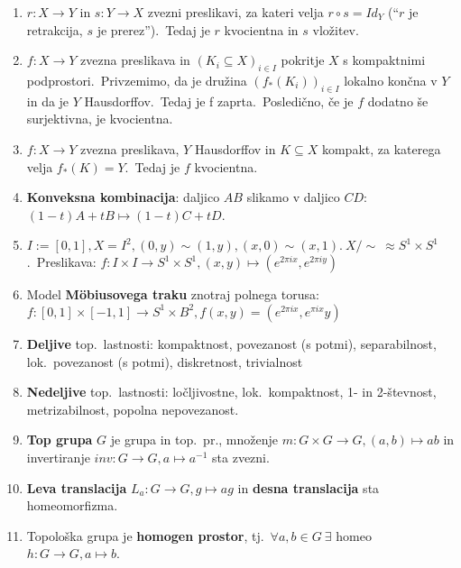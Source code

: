 \documentclass[10pt,a4paper]{article}
\begin{document}
\begin{enumerate}
\item  $r: X \rightarrow Y$ in $s: Y \rightarrow X$ zvezni preslikavi, za
    kateri velja $r \circ  s = Id_Y$ (``$r$ je retrakcija, $s$ je prerez'').~Tedaj je $r$
    kvocientna in $s$ vložitev.
    
\item  $f : X \rightarrow Y$ zvezna preslikava in $(K_i \subseteq  X)_{i \in I}$ pokritje
    $X$ s kompaktnimi podprostori.~Privzemimo, da je družina $(f_*(K_i))_{i \in I}$
    lokalno končna v $Y$ in da je $Y$ Hausdorffov.~Tedaj je f zaprta.~Posledično,
    če je $f$ dodatno še surjektivna, je kvocientna.
    
\item  $f : X \rightarrow Y$ zvezna preslikava, $Y$ Hausdorffov in $K \subseteq X$
    kompakt, za katerega velja $f_*(K) = Y$.~Tedaj je $f$ kvocientna.
    
\item \textbf{Konveksna kombinacija}: daljico $AB$ slikamo v daljico $CD: $
    $(1-t)A + tB \mapsto (1-t)C + tD$.
    
\item $I := [0, 1], X = I^2, (0, y) \sim (1, y), (x, 0) \sim (x, 1).~X/\sim \
    \approx S^1 \times S^1$.~Preslikava: $f: I \times I \rightarrow S^1 \times S^1,
    (x, y) \mapsto (e^{2 \pi i x}, e^{2 \pi i y})$
    
\item Model \textbf{Möbiusovega traku} znotraj polnega torusa: $f: [0, 1] \times [-1, 1]
    \rightarrow S^1 \times B^2, f(x, y) = (e^{2 \pi i x}, e^{\pi i x}y)$
    
\item \textbf{Deljive} top.~lastnosti: kompaktnost, povezanost (s potmi), separabilnost,
    lok.~povezanost (s potmi), diskretnost, trivialnost
    
\item \textbf{Nedeljive} top.~lastnosti: ločljivostne, lok.~kompaktnost, 1- in 2-števnost,
    metrizabilnost, popolna nepovezanost.
    
\item \textbf{Top grupa} $G$ je grupa in top.~pr., množenje $m: G \times
    G \rightarrow G, (a, b) \mapsto ab$ in invertiranje $inv: G \rightarrow G, a
    \mapsto a^{-1}$ sta zvezni.
    
\item \textbf{Leva translacija} $L_a : G \rightarrow G, g \mapsto ag$ in
    \textbf{desna translacija} sta homeomorfizma.
    
\item Topološka grupa je \textbf{homogen prostor}, tj.~$\forall a, b \in G \
    \exists$ homeo $h: G \rightarrow G, a \mapsto b$.
    

\end{enumerate}
\end{document}
